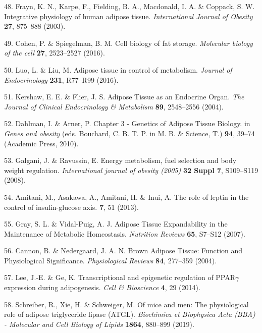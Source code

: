 \documentclass[11pt,twoside]{bristolthesis}
\begin{document}
\leavevmode\hypertarget{ref-Frayn2003}{}%
48. Frayn, K. N., Karpe, F., Fielding, B. A., Macdonald, I. A. \& Coppack, S. W. Integrative physiology of human adipose tissue. \emph{International Journal of Obesity} \textbf{27}, 875--888 (2003).

\leavevmode\hypertarget{ref-Cohen2016}{}%
49. Cohen, P. \& Spiegelman, B. M. Cell biology of fat storage. \emph{Molecular biology of the cell} \textbf{27}, 2523--2527 (2016).

\leavevmode\hypertarget{ref-Luo2016}{}%
50. Luo, L. \& Liu, M. Adipose tissue in control of metabolism. \emph{Journal of Endocrinology} \textbf{231}, R77--R99 (2016).

\leavevmode\hypertarget{ref-Kershaw2004}{}%
51. Kershaw, E. E. \& Flier, J. S. Adipose Tissue as an Endocrine Organ. \emph{The Journal of Clinical Endocrinology \& Metabolism} \textbf{89}, 2548--2556 (2004).

\leavevmode\hypertarget{ref-Dahlman2010}{}%
52. Dahlman, I. \& Arner, P. Chapter 3 - Genetics of Adipose Tissue Biology. in \emph{Genes and obesity} (eds. Bouchard, C. B. T. P. in M. B. \& Science, T.) \textbf{94}, 39--74 (Academic Press, 2010).

\leavevmode\hypertarget{ref-Galgani2008}{}%
53. Galgani, J. \& Ravussin, E. Energy metabolism, fuel selection and body weight regulation. \emph{International journal of obesity (2005)} \textbf{32 Suppl 7}, S109--S119 (2008).

\leavevmode\hypertarget{ref-Amitani2013}{}%
54. Amitani, M., Asakawa, A., Amitani, H. \& Inui, A. The role of leptin in the control of insulin-glucose axis. \textbf{7}, 51 (2013).

\leavevmode\hypertarget{ref-Gray2007}{}%
55. Gray, S. L. \& Vidal-Puig, A. J. Adipose Tissue Expandability in the Maintenance of Metabolic Homeostasis. \emph{Nutrition Reviews} \textbf{65}, S7--S12 (2007).

\leavevmode\hypertarget{ref-Cannon2004}{}%
56. Cannon, B. \& Nedergaard, J. A. N. Brown Adipose Tissue: Function and Physiological Significance. \emph{Physiological Reviews} \textbf{84}, 277--359 (2004).

\leavevmode\hypertarget{ref-Lee2014}{}%
57. Lee, J.-E. \& Ge, K. Transcriptional and epigenetic regulation of PPAR\(\gamma\) expression during adipogenesis. \emph{Cell \& Bioscience} \textbf{4}, 29 (2014).

\leavevmode\hypertarget{ref-Schreiber2019}{}%
58. Schreiber, R., Xie, H. \& Schweiger, M. Of mice and men: The physiological role of adipose triglyceride lipase (ATGL). \emph{Biochimica et Biophysica Acta (BBA) - Molecular and Cell Biology of Lipids} \textbf{1864}, 880--899 (2019).
\end{document}
